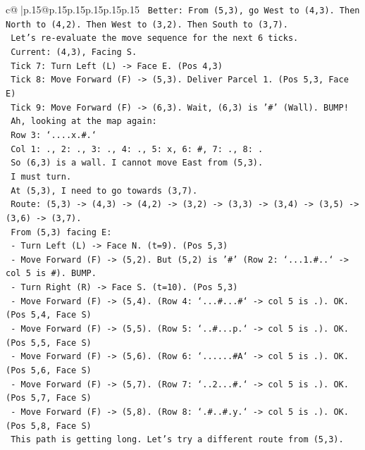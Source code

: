 \documentclass{article}
\begin{document}
{\begin{supertabular}{c@{$\;$}|p{.15\linewidth}@{}p{.15\linewidth}p{.15\linewidth}p{.15\linewidth}p{.15\linewidth}p{.15\linewidth}}
{{{\texttt{   Better: From (5,3), go West to (4,3). Then North to (4,2). Then West to (3,2). Then South to (3,7).} \\
\texttt{   Let's re{-}evaluate the move sequence for the next 6 ticks.} \\
\texttt{   Current: (4,3), Facing S.} \\
\texttt{   Tick 7: Turn Left (L) {-}> Face E. (Pos 4,3)} \\
\texttt{   Tick 8: Move Forward (F) {-}> (5,3). Deliver Parcel 1. (Pos 5,3, Face E)} \\
\texttt{   Tick 9: Move Forward (F) {-}> (6,3). Wait, (6,3) is '\#' (Wall). BUMP!} \\
\texttt{   Ah, looking at the map again:} \\
\texttt{   Row 3: `....x.\#.`} \\
\texttt{   Col 1: ., 2: ., 3: ., 4: ., 5: x, 6: \#, 7: ., 8: .} \\
\texttt{   So (6,3) is a wall. I cannot move East from (5,3).} \\
\texttt{   I must turn.} \\
\texttt{   At (5,3), I need to go towards (3,7).} \\
\texttt{   Route: (5,3) {-}> (4,3) {-}> (4,2) {-}> (3,2) {-}> (3,3) {-}> (3,4) {-}> (3,5) {-}> (3,6) {-}> (3,7).} \\
\texttt{   From (5,3) facing E:} \\
\texttt{   {-} Turn Left (L) {-}> Face N. (t=9). (Pos 5,3)} \\
\texttt{   {-} Move Forward (F) {-}> (5,2). But (5,2) is '\#' (Row 2: `...1.\#..` {-}> col 5 is \#). BUMP.} \\
\texttt{   {-} Turn Right (R) {-}> Face S. (t=10). (Pos 5,3)} \\
\texttt{   {-} Move Forward (F) {-}> (5,4). (Row 4: `...\#...\#` {-}> col 5 is .). OK. (Pos 5,4, Face S)} \\
\texttt{   {-} Move Forward (F) {-}> (5,5). (Row 5: `..\#...p.` {-}> col 5 is .). OK. (Pos 5,5, Face S)} \\
\texttt{   {-} Move Forward (F) {-}> (5,6). (Row 6: `......\#A` {-}> col 5 is .). OK. (Pos 5,6, Face S)} \\
\texttt{   {-} Move Forward (F) {-}> (5,7). (Row 7: `..2...\#.` {-}> col 5 is .). OK. (Pos 5,7, Face S)} \\
\texttt{   {-} Move Forward (F) {-}> (5,8). (Row 8: `.\#..\#.y.` {-}> col 5 is .). OK. (Pos 5,8, Face S)} \\
\texttt{   This path is getting long. Let's try a different route from (5,3).} \\
}}}
\end{supertabular}}
\end{document}
